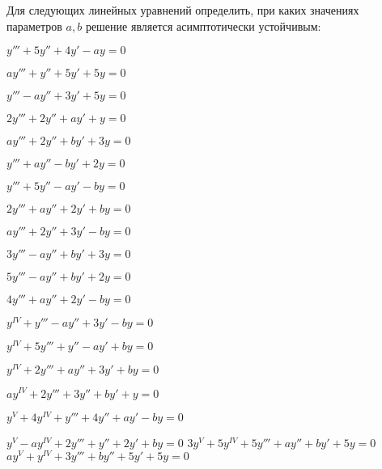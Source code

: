 	Для следующих линейных уравнений определить, при каких значениях параметров $a, b$ решение является асимптотически устойчивым:
	\begin{multicols}{2}
		\begin{enumtasks}
			
			\label{stability_hurwitz:params_ab}
			\item \( y''' + 5y'' + 4y' - ay = 0 \) %
			\item \( ay''' + y'' + 5y' + 5y = 0 \) %
			\item \( y''' - ay'' + 3y' + 5y = 0 \) %
			\item \( 2y''' + 2y'' + ay' + y = 0 \) %
			\item \( ay''' + 2y'' + by' + 3y = 0 \) %
			\item \( y''' + ay'' - by' + 2y = 0 \) %
			\item \( y''' + 5y'' - ay' - by = 0 \) %
			\item \( 2y''' + ay'' + 2y' + by = 0 \) %
			\item \( ay''' + 2y'' + 3y' - by = 0 \) %
			\item \( 3y''' - ay'' + by' + 3y = 0 \) %
			
			\label{stability_hurwitz:params_ab_part2}
			\item \( 5y''' - ay'' + by' + 2y = 0 \) %
			\item \( 4y''' + ay'' + 2y' - by = 0 \) %
			\item \( y^{IV} + y''' - ay'' + 3y' - by = 0 \) %
			\item \( y^{IV} + 5y''' + y'' - ay' + by = 0 \) %
			\item \( y^{IV} + 2y''' + ay'' + 3y' + by = 0 \) %
			\item \( ay^{IV} + 2y''' + 3y'' + by' + y = 0 \) %
			\item \( y^{V} + 4y^{IV} + y''' + 4y'' + ay' - by = 0 \) %
			\item \( y^{V} - ay^{IV} + 2y''' + y'' + 2y' + by = 0 \) %
			\itemstar \( 3y^{V} + 5y^{IV} + 5y''' + ay'' + by' + 5y = 0 \) %
			\itemstar \( ay^{V} + y^{IV} + 3y''' + by'' + 5y' + 5y = 0 \) %

		\end{enumtasks}
	\end{multicols}